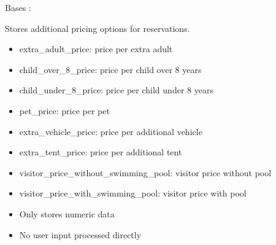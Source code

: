\documentclass[letterpaper,10pt,french]{sphinxmanual}
\begin{document}
\begin{fulllineitems}
\label{\detokenize{index:bookings.models.SupplementPrice}}
\pysigstartsignatures
\pysiglinewithargsret
{}
{\sphinxparamcomma {}}
{}
\pysigstopsignatures
\sphinxAtStartPar
Bases : 

\sphinxAtStartPar
Stores additional pricing options for reservations.
\begin{description}
\begin{itemize}
\item {} 
\sphinxAtStartPar
extra\_adult\_price: price per extra adult

\item {} 
\sphinxAtStartPar
child\_over\_8\_price: price per child over 8 years

\item {} 
\sphinxAtStartPar
child\_under\_8\_price: price per child under 8 years

\item {} 
\sphinxAtStartPar
pet\_price: price per pet

\item {} 
\sphinxAtStartPar
extra\_vehicle\_price: price per additional vehicle

\item {} 
\sphinxAtStartPar
extra\_tent\_price: price per additional tent

\item {} 
\sphinxAtStartPar
visitor\_price\_without\_swimming\_pool: visitor price without pool

\item {} 
\sphinxAtStartPar
visitor\_price\_with\_swimming\_pool: visitor price with pool

\end{itemize}

\begin{itemize}
\item {} 
\sphinxAtStartPar
Only stores numeric data

\item {} 
\sphinxAtStartPar
No user input processed directly

\end{itemize}


\end{description}
\end{fulllineitems}
\end{document}
